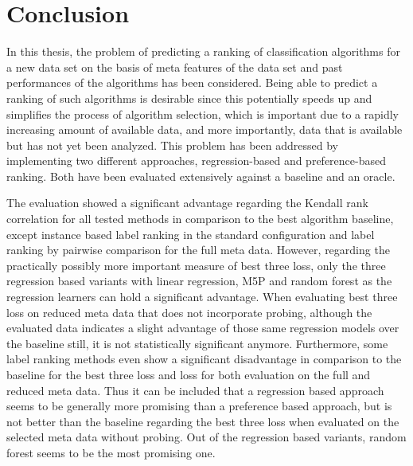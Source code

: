 \chapter{Conclusion}
\label{sec:conclusion}
In this thesis, the problem of predicting a ranking of classification algorithms for a new data set on the basis of meta features of the data set and past performances of the algorithms has been considered. Being able to predict a ranking of such algorithms is desirable since this potentially speeds up and simplifies the process of algorithm selection, which is important due to a rapidly increasing amount of available data, and more importantly, data that is available but has not yet been analyzed. This problem has been addressed by implementing two different approaches, regression-based and preference-based ranking. Both have been evaluated extensively against a baseline and an oracle.

The evaluation showed a significant advantage regarding the Kendall rank correlation for all tested methods in comparison to the best algorithm baseline, except instance based label ranking in the standard configuration and label ranking by pairwise comparison for the full meta data. However, regarding the practically possibly more important measure of best three loss, only the three regression based variants with linear regression, M5P and random forest as the regression learners can hold a significant advantage. When evaluating best three loss on reduced meta data that does not incorporate probing, although the evaluated data indicates a slight advantage of those same regression models over the baseline still, it is not statistically significant anymore. Furthermore, some label ranking methods even show a significant disadvantage in comparison to the baseline for the best three loss and loss for both evaluation on the full and reduced meta data. Thus it can be included that a regression based approach seems to be generally more promising than a preference based approach, but is not better than the baseline regarding the best three loss when evaluated on the selected meta data without probing. Out of the regression based variants, random forest seems to be the most promising one.

